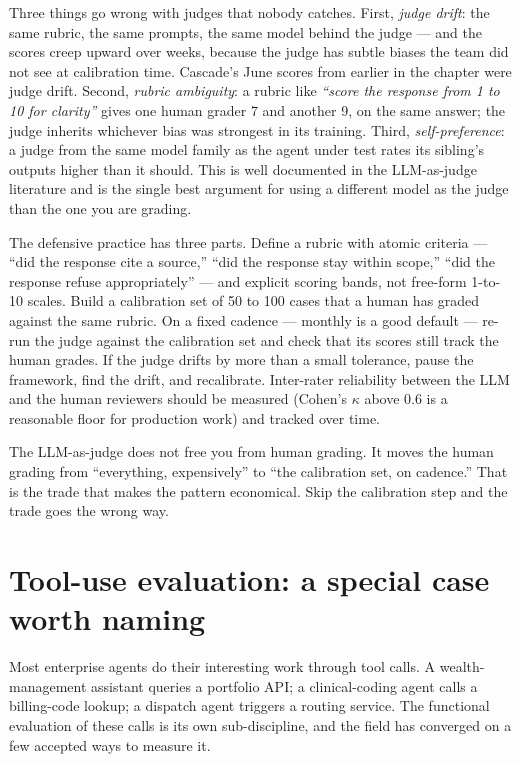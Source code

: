 Three things go wrong with judges that nobody catches. First, \textit{judge drift}: the same rubric, the same prompts, the same model behind the judge --- and the scores creep upward over weeks, because the judge has subtle biases the team did not see at calibration time. Cascade's June scores from earlier in the chapter were judge drift. Second, \textit{rubric ambiguity}: a rubric like \textit{``score the response from 1 to 10 for clarity''} gives one human grader 7 and another 9, on the same answer; the judge inherits whichever bias was strongest in its training. Third, \textit{self-preference}: a judge from the same model family as the agent under test rates its sibling's outputs higher than it should. This is well documented in the LLM-as-judge literature and is the single best argument for using a different model as the judge than the one you are grading.

The defensive practice has three parts. Define a rubric with atomic criteria --- ``did the response cite a source,'' ``did the response stay within scope,'' ``did the response refuse appropriately'' --- and explicit scoring bands, not free-form 1-to-10 scales. Build a calibration set of 50 to 100 cases that a human has graded against the same rubric. On a fixed cadence --- monthly is a good default --- re-run the judge against the calibration set and check that its scores still track the human grades. If the judge drifts by more than a small tolerance, pause the framework, find the drift, and recalibrate. Inter-rater reliability between the LLM and the human reviewers should be measured (Cohen's $\kappa$ above 0.6 is a reasonable floor for production work) and tracked over time.

The LLM-as-judge does not free you from human grading. It moves the human grading from ``everything, expensively'' to ``the calibration set, on cadence.'' That is the trade that makes the pattern economical. Skip the calibration step and the trade goes the wrong way.

\section{Tool-use evaluation: a special case worth naming}

Most enterprise agents do their interesting work through tool calls. A wealth-management assistant queries a portfolio API; a clinical-coding agent calls a billing-code lookup; a dispatch agent triggers a routing service. The functional evaluation of these calls is its own sub-discipline, and the field has converged on a few accepted ways to measure it.

